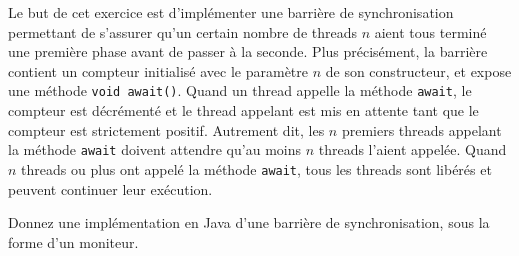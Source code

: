 
\begingroup

\begin{exercice}
  \label{exo:monitors/barrier}

  Le but de cet exercice est d'implémenter une barrière de synchronisation permettant de s'assurer qu'un certain nombre de threads $n$ aient
  tous terminé une première phase avant de passer à la seconde. Plus précisément, la barrière contient un compteur initialisé
  avec le paramètre $n$ de son constructeur, et expose une méthode \lstinline{void await()}.
  Quand un thread appelle la méthode \lstinline{await}, le compteur est décrémenté et le thread appelant
  est mis en attente tant que le compteur est strictement positif. Autrement dit, les $n$ premiers threads
  appelant la méthode \lstinline{await} doivent attendre qu'au moins $n$ threads l'aient appelée.
  Quand $n$ threads ou plus ont appelé la méthode \lstinline{await}, tous les threads sont libérés
  et peuvent continuer leur exécution.

  \begin{questions}
  \item Donnez une implémentation en Java d'une barrière de synchronisation, sous la forme d'un moniteur. 
  \end{questions}

\end{exercice}

\endgroup
\endinput
